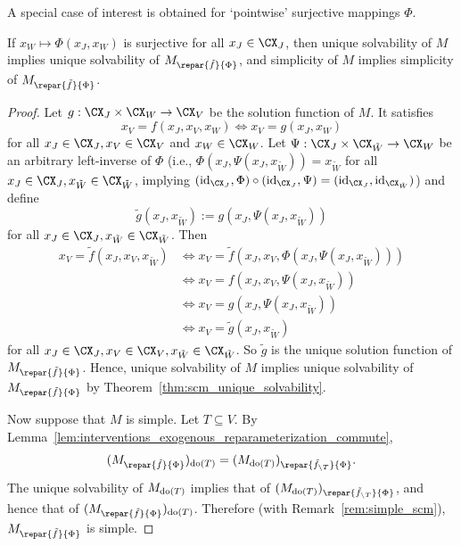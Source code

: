 A special case of interest is obtained for `pointwise' surjective mappings $\Phi$.
\begin{Cor}
  If $x_W \mapsto \Phi(x_J,x_W)$ is surjective for all $x_J \in \CX_J$, then unique solvability of $M$ implies unique solvability of $M_{\repar{\tilde{f}}{\Phi}}$,
  and simplicity of $M$ implies simplicity of $M_{\repar{\tilde{f}}{\Phi}}$.
\end{Cor}
\begin{proof}
  Let $g : \CX_J \times \CX_W \to \CX_V$ be the solution function of $M$. 
  It satisfies
  $$x_V = f(x_J,x_V,x_W) \iff x_V = g(x_J,x_W)$$
  for all $x_J \in \CX_J, x_V \in \CX_V$ and $x_W \in \CX_W$.
  Let $\Psi : \CX_J \times \CX_{\tilde{W}} \to \CX_W$ be an arbitrary left-inverse of $\Phi$ (i.e., 
  $\Phi(x_J,\Psi(x_J,x_{\tilde{W}})) = x_{\tilde{W}}$ for all $x_J \in \CX_J, x_{\tilde{W}} \in \CX_{\tilde{W}}$,
  implying
  $(\id_{\CX_J},\Phi) \circ (\id_{\CX_J},\Psi) = (\id_{\CX_J},\id_{\CX_{\tilde{W}}})$)
  and define 
  $$\tilde{g}(x_J,x_{\tilde{W}}) := g(x_J,\Psi(x_J,x_{\tilde{W}}))$$
  for all $x_J \in \CX_J, x_{\tilde{W}} \in \CX_{\tilde{W}}$. 
  Then
  \begin{equation*}\begin{split}
    x_V = \tilde{f}(x_J,x_V,x_{\tilde{W}}) 
    &\iff x_V = \tilde{f}(x_J,x_V,\Phi(x_J,\Psi(x_J,x_{\tilde{W}}))) \\
    &\iff x_V = f(x_J,x_V,\Psi(x_J,x_{\tilde{W}})) \\
    &\iff x_V = g(x_J,\Psi(x_J,x_{\tilde{W}})) \\
    &\iff x_V = \tilde{g}(x_J,x_{\tilde{W}})
  \end{split}\end{equation*}
  for all $x_J \in \CX_J, x_V \in \CX_V, x_{\tilde{W}} \in \CX_{\tilde{W}}$.
  So $\tilde{g}$ is the unique solution function of $M_{\repar{\tilde{f}}{\Phi}}$.
  Hence, unique solvability of $M$ implies unique solvability of $M_{\repar{\tilde{f}}{\Phi}}$ by Theorem~\ref{thm:scm_unique_solvability}.

  Now suppose that $M$ is simple. Let $T \subseteq V$. By Lemma~\ref{lem:interventions_exogenous_reparameterization_commute}, 
  $$(M_{\repar{\tilde{f}}{\Phi}})_{\doit(T)} = (M_{\doit(T)})_{\repar{\tilde{f}_{\sm T}}{\Phi}}.$$
  The unique solvability of $M_{\operatorname{do}(T)}$ implies that of $(M_{\doit(T)})_{\repar{\tilde{f}_{\sm T}}{\Phi}}$,
  and hence that of $(M_{\repar{\tilde{f}}{\Phi}})_{\doit(T)}$.
  Therefore (with Remark~\ref{rem:simple_scm}), $M_{\repar{\tilde{f}}{\Phi}}$ is simple.
\end{proof}

